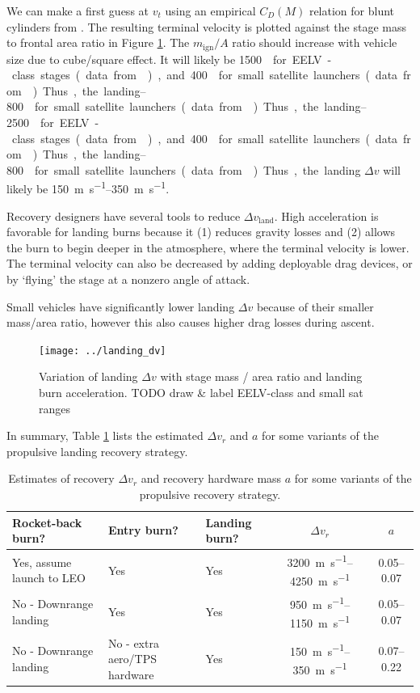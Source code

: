 \documentclass[conf]{new-aiaa}
\begin{document}
We can make a first guess at $v_t$ using an empirical $C_D(M)$ relation for blunt cylinders from \cite{Hoerner1965}. The resulting terminal velocity is plotted against the stage mass to frontal area ratio in Figure \ref{fig:landing_dv}. The $m_{\mathrm{ign}}/A$ ratio should increase with vehicle size due to cube/square effect. It will likely be \SIrange{1500}{2500}{\kilogram\per\meter\square} for EELV-class stages (data from \cite{wade:atlas, braeunig:delta, wiki:Falcon9FullThrust}), and \SIrange{400}{800}{\kilogram\per\meter\square} for small satellite launchers (data from \cite{electron}). Thus, the landing $\Delta v$ will likely be \SIrange{150}{350}{\meter\per\second}.

Recovery designers have several tools to reduce $\Delta v_{\mathrm{land}}$. High acceleration is favorable for landing burns because it (1) reduces gravity losses and (2) allows the burn to begin deeper in the atmosphere, where the terminal velocity is lower. The terminal velocity can also be decreased by adding deployable drag devices, or by `flying' the stage at a nonzero angle of attack.

Small vehicles have significantly lower landing $\Delta v$ because of their smaller mass/area ratio, however this also causes higher drag losses during ascent.

\begin{figure}[hbt!]
	\centering
	\texttt{[image: ../landing\_dv]}
	\label{fig:landing_dv}
	\caption{Variation of landing $\Delta v$ with stage mass / area ratio and landing burn acceleration. TODO draw \& label EELV-class and small sat ranges}
\end{figure}

In summary, Table \ref{tab:propulsive_strategies} lists the estimated $\Delta v_r$ and $a$ for some variants of the propulsive landing recovery strategy.

\begin{table}
	\caption{\label{tab:propulsive_strategies} Estimates of recovery $\Delta v_r$ and recovery hardware mass $a$ for some variants of the propulsive recovery strategy.}
	\centering
	\begin{tabular}{p{3cm} p{3cm} p{2cm} c c}
		Rocket-back burn? & Entry burn? & Landing burn? & $\Delta v_r$ & $a$ \\
		\hline
		Yes, assume launch to LEO & Yes & Yes & \SIrange{3200}{4250}{\meter\per\second} & \SIrange{0.05}{0.07}{}\\
		No - Downrange landing & Yes & Yes & \SIrange{950}{1150}{\meter\per\second} & \SIrange{0.05}{0.07}{} \\
		No - Downrange landing & No - extra aero/TPS hardware & Yes & \SIrange{150}{350}{\meter\per\second} & \SIrange{0.07}{0.22}{}\\
		\hline
	\end{tabular}
\end{table}
\end{document}
